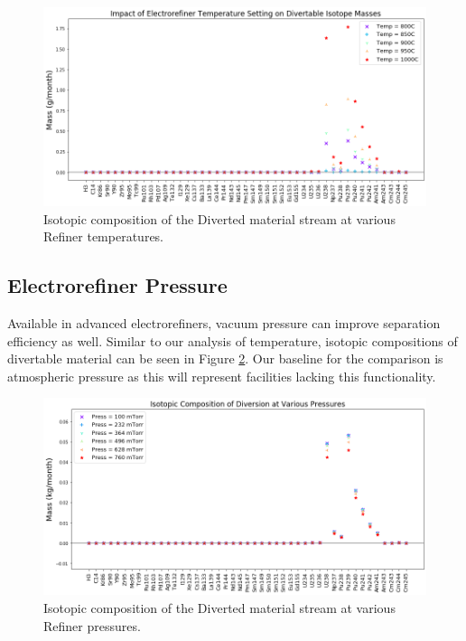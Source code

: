 \begin{figure}
	\includegraphics[width=\linewidth]{images/temperature-sa-diff}
	\caption{Isotopic composition of the Diverted material stream at various Refiner temperatures.}
	\label{fig:ref-temp-diff}
\end{figure}

\subsection{Electrorefiner Pressure}

Available in advanced electrorefiners, vacuum pressure can improve separation efficiency as well. Similar to our analysis of temperature, isotopic compositions of
divertable material can be seen in Figure \ref{fig:ref-press-sa}. Our baseline for the comparison is atmospheric pressure as this will represent facilities lacking this
functionality. 

\begin{figure}
	\includegraphics[width=\linewidth]{images/pressure-sa-comp}
	\caption{Isotopic composition of the Diverted material stream at various Refiner pressures.}
	\label{fig:ref-press-sa}
\end{figure}

